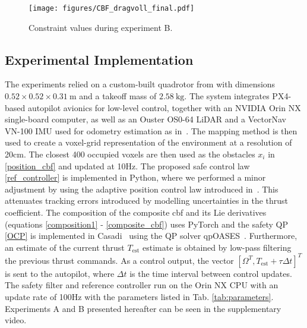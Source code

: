 \begin{figure}
    \centering
    \texttt{[image: figures/CBF\_dragvoll\_final.pdf]}
    \vspace{-6ex}
    \caption{\small Constraint values during experiment B.}
    \label{fig:CBF_dragvoll}
    \vspace{-3.5ex}
\end{figure}

\subsection{Experimental Implementation}
The experiments relied on a custom-built quadrotor from \cite{harms2024neural} with dimensions $0.52\times 0.52\times0.31~\textrm{m}$ and a takeoff mass of $2.58~\textrm{kg}$. The system integrates PX4-based autopilot avionics for low-level control, together with an NVIDIA Orin NX single-board computer, as well as an Ouster OS0-64 LiDAR and a VectorNav VN-100 IMU used for odometry estimation as in~\cite{khattak2020complementary}. The mapping method \cite{voxblox} is then used to create a voxel-grid representation of the environment at a resolution of 20cm. The closest 400 occupied voxels are then used as the obstacles $x_i$ in \eqref{position_cbf} and updated at 10Hz.
The proposed safe control law \eqref{ref_controller} is implemented in Python, where we performed a minor adjustment by using the adaptive position control law introduced in~\cite{TalINDI}. This attenuates tracking errors introduced by modelling uncertainties in the thrust coefficient. The composition of the composite \ac{cbf} and its Lie derivatives (equations \eqref{composition1} - \eqref{composite_cbf}) uses PyTorch and the safety QP \eqref{OCP} is implemented in Casadi~\cite{Andersson_Casadi} using the QP solver qpOASES~\cite{Ferreau_qpOASES}. Furthermore, an estimate of the current thrust $T_\text{est}$ estimate is obtained by low-pass filtering the previous thrust commands. As a control output, the vector $[\Omega^T,T_\text{est}+ \tau \Delta t ]^T$ is sent to the autopilot, where $\Delta t$ is the time interval between control updates.
The safety filter and reference controller run on the Orin NX CPU with an update rate of 100Hz with the parameters listed in Tab. \ref{tab:parameters}.
Experiments A and B presented hereafter can be seen in the supplementary video.

